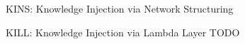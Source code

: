 \documentclass[presentation]{beamer}\mode<presentation>{\usetheme{AMSBolognaFC}}
\begin{document}
\begin{frame}[allowframebreaks]{KINS: Knowledge Injection via Network Structuring}
    
    
\end{frame}

\begin{frame}[allowframebreaks]{KILL: Knowledge Injection via Lambda Layer}
    TODO
\end{frame}

\section{\psyki}
\end{document}
